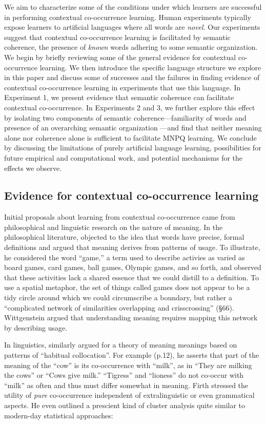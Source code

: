 \documentclass[man,floatsintext]{apa6}
\begin{document}
We aim to characterize some of the conditions under which learners are successful in performing contextual co-occurrence learning. Human experiments typically expose learners to artificial languages where all words are \emph{novel}. Our experiments suggest that contextual co-occurrence learning is facilitated by semantic coherence, the presence of \emph{known} words adhering to some semantic organization. We begin by briefly reviewing some of the general evidence for contextual co-occurrence learning. We then introduce the specific language structure we explore in this paper and discuss some of successes and the failures in finding evidence of contextual co-occurrence learning in experiments that use this language. In Experiment 1, we present evidence that semantic coherence can facilitate contextual co-occurrence. In Experiments 2 and 3, we further explore this effect by isolating two components of semantic coherence---familiarity of words and presence of an overarching semantic organization ---and find that neither meaning alone nor coherence alone is sufficient to facilitate MNPQ learning. We conclude by discussing the limitations of purely artificial language learning, possibilities for future empirical and computational work, and potential mechanisms for the effects we observe.
 
\subsection{Evidence for contextual co-occurrence learning}

Initial proposals about learning from contextual co-occurrence came from philosophical and linguistic research on the nature of meaning. In the philosophical literature, \citep{wittgenstein1997} objected to the idea that words have precise, formal definitions and argued that meaning derives from patterns of usage. To illustrate, he considered the word ``game,'' a term used to describe activies as varied as board games, card games, ball games, Olympic games, and so forth, and observed that these activities lack a shared essence that we could distill to a definition. To use a spatial metaphor, the set of things called games does not appear to be a tidy circle around which we could circumscribe a boundary, but rather a ``complicated network of similarities overlapping and crisscrossing'' (\S 66). Wittgenstein argued that understanding meaning requires mapping this network by describing usage.

In linguistics, \citet{firth1957} similarly argued for a theory of meaning meanings based on patterns of ``habitual collocation''. For example (p.12), he asserts that part of the meaning of the ``cow'' is its co-occurrence with  ``milk'', as in ``They are milking the cows'' or ``Cows give milk.'' ``Tigress'' and ``lioness'' do not co-occur with ``milk'' as often and thus must differ somewhat in meaning. Firth stressed the utility of \emph{pure} co-occurrence independent of extralinguistic or even grammatical aspects. He even outlined a prescient kind of cluster analysis quite similar to modern-day statistical approaches:
\end{document}
